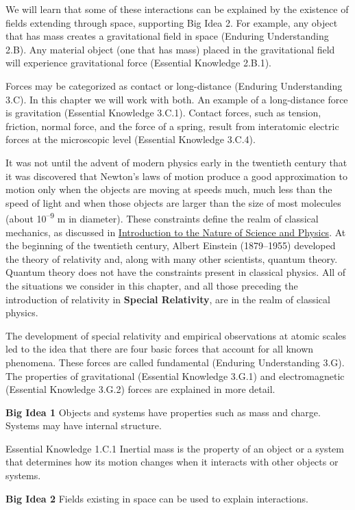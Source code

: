 \documentclass[
]{book}
\begin{document}
We will learn that some of these interactions can be explained by the
existence of fields extending through space, supporting Big Idea 2. For
example, any object that has mass creates a gravitational field in space
(Enduring Understanding 2.B). Any material object (one that has mass)
placed in the gravitational field will experience gravitational force
(Essential Knowledge 2.B.1).

Forces may be categorized as contact or long-distance (Enduring
Understanding 3.C). In this chapter we will work with both. An example
of a long-distance force is gravitation (Essential Knowledge 3.C.1).
Contact forces, such as tension, friction, normal force, and the force
of a spring, result from interatomic electric forces at the microscopic
level (Essential Knowledge 3.C.4).

It was not until the advent of modern physics early in the twentieth
century that it was discovered that Newton's laws of motion produce a
good approximation to motion only when the objects are moving at speeds
much, much less than the speed of light and when those objects are
larger than the size of most molecules (about 10\textsuperscript{--9} m in diameter).
These constraints define the realm of classical mechanics, as discussed
in \href{/m54763}{Introduction to the Nature of Science and Physics}. At the
beginning of the twentieth century, Albert Einstein (1879--1955)
developed the theory of relativity and, along with many other
scientists, quantum theory. Quantum theory does not have the constraints
present in classical physics. All of the situations we consider in this
chapter, and all those preceding the introduction of relativity in
\textbf{Special Relativity}, are in the realm of classical physics.

The development of special relativity and empirical observations at
atomic scales led to the idea that there are four basic forces that
account for all known phenomena. These forces are called fundamental
(Enduring Understanding 3.G). The properties of gravitational (Essential
Knowledge 3.G.1) and electromagnetic (Essential Knowledge 3.G.2) forces
are explained in more detail.

\textbf{Big Idea 1} Objects and systems have properties such as mass and
charge. Systems may have internal structure.

Essential Knowledge 1.C.1 Inertial mass is the property of an object or
a system that determines how its motion changes when it interacts with
other objects or systems.

\textbf{Big Idea 2} Fields existing in space can be used to explain
interactions.
\end{document}
